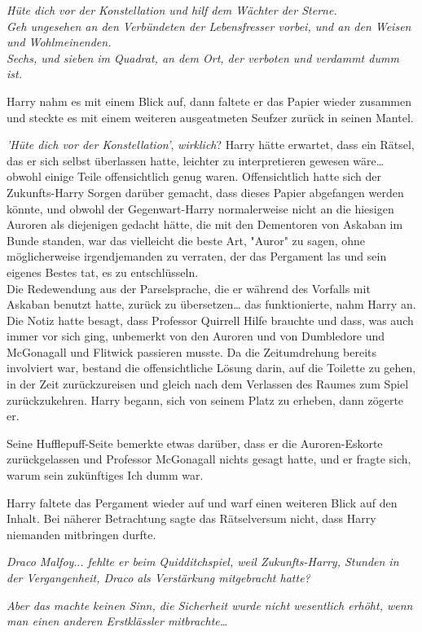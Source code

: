 {\emph{Hüte dich vor der Konstellation und hilf dem Wächter der Sterne.}\\ \emph{Geh ungesehen an den Verbündeten der Lebensfresser vorbei, und an den Weisen und Wohlmeinenden.\\ Sechs, und sieben im Quadrat, an dem Ort, der verboten und verdammt dumm ist.}

Harry nahm es mit einem Blick auf, dann faltete er das Papier wieder zusammen und steckte es mit einem weiteren ausgeatmeten Seufzer zurück in seinen Mantel.

\emph{'Hüte dich vor der Konstellation'}, \emph{wirklich}? Harry hätte erwartet, dass ein Rätsel, das er sich selbst überlassen hatte, leichter zu interpretieren gewesen wäre… obwohl einige Teile offensichtlich genug waren. Offensichtlich hatte sich der Zukunfts-Harry Sorgen darüber gemacht, dass dieses Papier abgefangen werden könnte, und obwohl der Gegenwart-Harry normalerweise nicht an die hiesigen Auroren als diejenigen gedacht hätte, die mit den Dementoren von Askaban im Bunde standen, war das vielleicht die beste Art, "Auror" zu sagen, ohne möglicherweise irgendjemanden zu verraten, der das Pergament las und sein eigenes Bestes tat, es zu entschlüsseln.\\ Die Redewendung aus der Parselsprache, die er während des Vorfalls mit Askaban benutzt hatte, zurück zu übersetzen… das funktionierte, nahm Harry an. Die Notiz hatte besagt, dass Professor Quirrell Hilfe brauchte und dass, was auch immer vor sich ging, unbemerkt von den Auroren und von Dumbledore und McGonagall und Flitwick passieren musste. Da die Zeitumdrehung bereits involviert war, bestand die offensichtliche Lösung darin, auf die Toilette zu gehen, in der Zeit zurückzureisen und gleich nach dem Verlassen des Raumes zum Spiel zurückzukehren. Harry begann, sich von seinem Platz zu erheben, dann zögerte er.

Seine Hufflepuff-Seite bemerkte etwas darüber, dass er die Auroren-Eskorte zurückgelassen und Professor McGonagall nichts gesagt hatte, und er fragte sich, warum sein zukünftiges Ich dumm war.

Harry faltete das Pergament wieder auf und warf einen weiteren Blick auf den Inhalt. Bei näherer Betrachtung sagte das Rätselversum nicht, dass Harry niemanden mitbringen durfte.

\emph{Draco Malfoy}..\emph{. fehlte er beim Quidditchspiel, weil Zukunfts-Harry, Stunden in der Vergangenheit, Draco als Verstärkung mitgebracht hatte?}

\emph{Aber das machte keinen Sinn, die Sicherheit wurde nicht wesentlich erhöht, wenn man einen anderen Erstklässler mitbrachte…}

}
